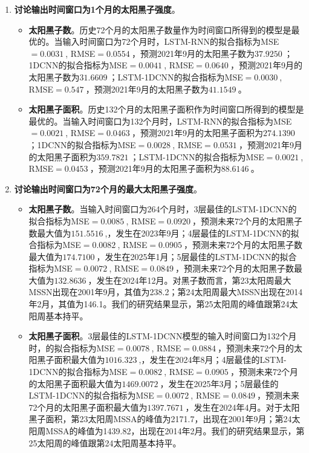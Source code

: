 \begin{enumerate}
    \begin{enumerate}
      \item \textbf{讨论输出时间窗口为1个月的太阳黑子强度}。
      \begin{itemize}
        \item \textbf{太阳黑子数}。历史72个月的太阳黑子数量作为时间窗口所得到的模型是最优的。当输入时间窗口为72个月时，LSTM-RNN的拟合指标为MSE$=\SI{0.0031}{}$, RMSE$=\SI{0.0554}{}$，预测2021年9月的太阳黑子数为$\SI{37.9250}{}$；1DCNN的拟合指标为MSE$=\SI{0.0041}{}$, RMSE$=\SI{0.0640}{}$，预测2021年9月的太阳黑子数为$\SI{31.6609}{}$；LSTM-1DCNN的拟合指标为MSE$=\SI{0.0030}{}$, RMSE$=\SI{0.547}{}$，预测2021年9月的太阳黑子数为$\SI{41.1549}{}$。
        \item \textbf{太阳黑子面积}。历史132个月的太阳黑子面积作为时间窗口所得到的模型是最优的。当输入时间窗口为132个月时，LSTM-RNN的拟合指标为MSE$=\SI{0.0021}{}$, RMSE$=\SI{0.0463}{}$，预测2021年9月的太阳黑子面积为$\SI{274.1390}{}$；1DCNN的拟合指标为MSE$=\SI{0.0028}{}$, RMSE$=\SI{0.0531}{}$，预测2021年9月的太阳黑子面积为$\SI{359.7821}{}$；LSTM-1DCNN的拟合指标为MSE$=\SI{0.0021}{}$, RMSE$=\SI{0.0453}{}$，预测2021年9月的太阳黑子面积为$\SI{88.6146}{}$。
      \end{itemize}
      \item \textbf{讨论输出时间窗口为72个月的最大太阳黑子强度}。
      \begin{itemize}
        \item \textbf{太阳黑子数}。当输入时间窗口为264个月时，3层最佳的LSTM-1DCNN的拟合指标为MSE$=\SI{0.0085}{}$, RMSE$=\SI{0.0920}{}$，预测未来72个月的太阳黑子数最大值为$\SI{151.5516}{}$,，发生在2023年9月；4层最佳的LSTM-1DCNN的拟合指标为MSE$=\SI{0.0082}{}$, RMSE$=\SI{0.0905}{}$，预测未来72个月的太阳黑子数最大值为$\SI{174.7100}{}$，发生在2025年1月；5层最佳的LSTM-1DCNN的拟合指标为MSE$=\SI{0.0072}{}$, RMSE$=\SI{0.0849}{}$，预测未来72个月的太阳黑子数最大值为$\SI{132.8636}{}$，发生在2024年12月。对黑子数而言，第23太阳周最大MSSN出现在2001年9月，其值为238.2；第24太阳周最大MSSN出现在2014年2月，其值为146.1。我们的研究结果显示，第25太阳周的峰值跟第24太阳周基本持平。 
        \item \textbf{太阳黑子面积}。3层最佳的LSTM-1DCNN模型的输入时间窗口为132个月时，的拟合指标为MSE$=\SI{0.0078}{}$, RMSE$=\SI{0.0884}{}$，预测未来72个月的太阳黑子面积最大值为$\SI{1016.323}{}$,，发生在2024年8月；4层最佳的LSTM-1DCNN的拟合指标为MSE$=\SI{0.0082}{}$, RMSE$=\SI{0.0905}{}$，预测未来72个月的太阳黑子面积最大值为$\SI{1469.0072}{}$，发生在2025年3月；5层最佳的LSTM-1DCNN的拟合指标为MSE$=\SI{0.0072}{}$, RMSE$=\SI{0.0849}{}$，预测未来72个月的太阳黑子面积最大值为$\SI{1397.7671}{}$，发生在2024年4月。对于太阳黑子面积，第23太阳周MSSA的峰值为2171.7，出现在2001年9月；第24太阳周MSSA的峰值为1439.82，出现在2014年2月。我们的研究结果显示，第25太阳周的峰值跟第24太阳周基本持平。 
      \end{itemize}
    \end{enumerate}
    

\end{enumerate}
